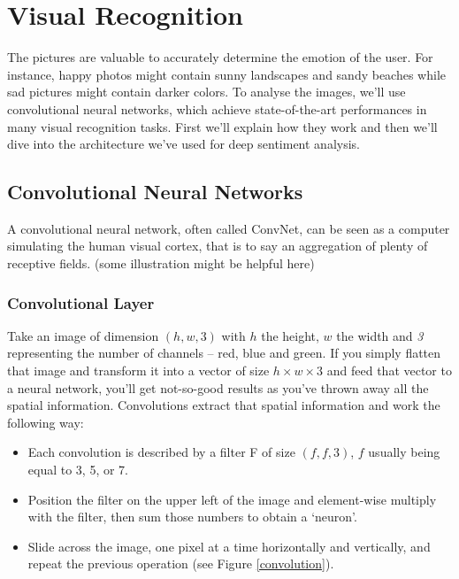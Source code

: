 \chapter{Visual Recognition}
The pictures are valuable to accurately determine the emotion of the user. For instance, happy photos might contain sunny landscapes and sandy beaches while sad pictures might contain darker colors. To analyse the images, we'll use convolutional neural networks, which achieve state-of-the-art performances in many visual recognition tasks. First we'll explain how they work and then we'll dive into the architecture we've used for deep sentiment analysis.
\section{Convolutional Neural Networks}
A convolutional neural network, often called ConvNet, can be seen as a computer simulating the human visual cortex, that is to say an aggregation of plenty of receptive fields. (some illustration might be helpful here)

\subsection{Convolutional Layer}
Take an image of dimension $(h,w,3)$ with $h$ the height, $w$ the width and {\em3} representing the number of channels -- red, blue and green. If you simply flatten that image and transform it into a vector of size $h\times w \times 3$ and feed that vector to a neural network, you'll get not-so-good results as you've thrown away all the spatial information. Convolutions extract that spatial information and work the following way:
\begin{itemize}
    \item Each convolution is described by a filter F of size $(f, f, 3)$, $f$ usually being equal to 3, 5, or 7.
    \item Position the filter on the upper left of the image and element-wise multiply with the filter, then sum those numbers to obtain a `neuron'.
    \item Slide across the image, one pixel at a time horizontally and vertically, and repeat the previous operation (see Figure \ref{convolution}).
\end{itemize}

